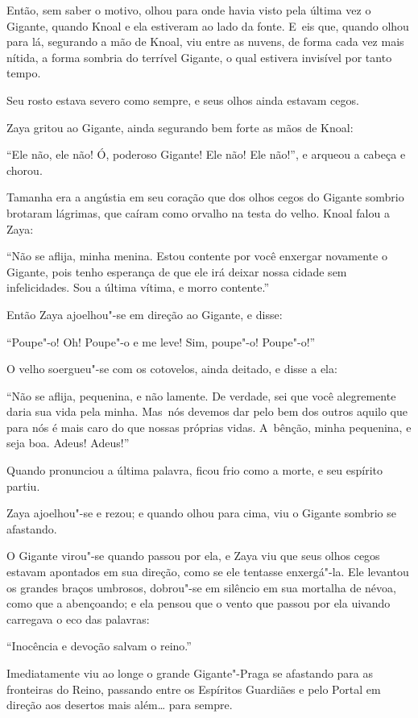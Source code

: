Então, sem saber o motivo, olhou para onde havia visto pela última vez o
Gigante, quando Knoal e ela estiveram ao lado da fonte. E~eis que, quando
olhou para lá, segurando a mão de Knoal, viu entre as nuvens, de
forma cada vez mais nítida, a forma sombria do terrível Gigante, o qual
estivera invisível por tanto tempo.

Seu rosto estava severo como sempre, e seus olhos ainda estavam cegos.

Zaya gritou ao Gigante, ainda segurando bem forte as mãos de Knoal:

``Ele não, ele não! Ó, poderoso Gigante! Ele não! Ele não!'', e arqueou
a cabeça e chorou.

Tamanha era a angústia em seu coração que dos olhos cegos do Gigante
sombrio brotaram lágrimas, que caíram como orvalho na testa do
velho. Knoal falou a Zaya:

``Não se aflija, minha menina. Estou contente por você enxergar novamente o
Gigante, pois tenho esperança de que ele irá deixar nossa cidade sem
infelicidades. Sou a última vítima, e morro contente.''

Então Zaya ajoelhou"-se em direção ao Gigante, e disse:

``Poupe"-o! Oh! Poupe"-o e me leve! Sim, poupe"-o! Poupe"-o!''

O velho soergueu"-se com os cotovelos, ainda deitado, e disse a ela:

``Não se aflija, pequenina, e não lamente. De verdade, sei que você
alegremente daria sua vida pela minha. Mas~nós devemos dar pelo bem dos
outros aquilo que para nós é mais caro do que nossas próprias vidas. A~bênção, minha pequenina, e seja boa. Adeus! Adeus!''

Quando pronunciou a última palavra, ficou frio como a morte, e seu
espírito partiu.

Zaya ajoelhou"-se e rezou; e quando olhou para cima, viu o Gigante
sombrio se afastando.

O Gigante virou"-se quando passou por ela, e Zaya viu que seus olhos
cegos estavam apontados em sua direção, como se ele tentasse enxergá"-la.
Ele levantou os grandes braços umbrosos, dobrou"-se em silêncio em sua
mortalha de névoa, como que a abençoando; e ela pensou que o vento que
passou por ela uivando carregava o eco das palavras:

``Inocência e devoção salvam o reino.''

\smallskip
Imediatamente viu ao longe o grande Gigante"-Praga se afastando para
as fronteiras do Reino, passando entre os Espíritos Guardiães e pelo
Portal em direção aos desertos mais além\ldots{} para sempre.
